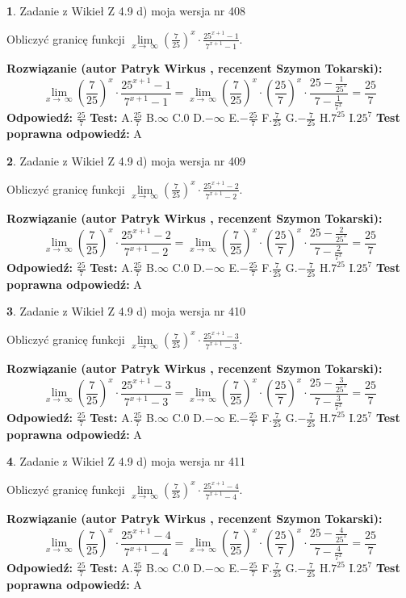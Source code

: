 \documentclass[12pt, a4paper]{article}
\theoremstyle{definition} %
\newtheorem{zad}{}
\newcommand{\zadStart}[1]{\begin{zad}#1\newline}
\newcommand{\zadStop}{\end{zad}}
\newcommand{\rozwStart}[2]{\noindent \textbf{Rozwiązanie (autor #1 , recenzent #2): }\newline}
\newcommand{\rozwStop}{\newline}
\newcommand{\odpStart}{\noindent \textbf{Odpowiedź:}\newline}
\newcommand{\odpStop}{\newline}
\newcommand{\testStart}{\noindent \textbf{Test:}\newline}
\newcommand{\testStop}{\newline}
\newcommand{\kluczStart}{\noindent \textbf{Test poprawna odpowiedź:}\newline}
\newcommand{\kluczStop}{\newline}
\begin{document}
\zadStart{Zadanie z Wikieł Z 4.9 d) moja wersja nr 408}


Obliczyć granicę funkcji  $\lim\limits_{x\to\ \infty}(\frac{7}{25})^{x}\cdot\frac{25^{x+1}-1}{7^{x+1}-1}$.
\zadStop
\rozwStart{Patryk Wirkus}{Szymon Tokarski}
$$\lim\limits_{x\to\ \infty}(\frac{7}{25})^{x}\cdot\frac{25^{x+1}-1}{7^{x+1}-1}=\lim\limits_{x\to\ \infty}(\frac{7}{25})^{x}\cdot(\frac{25}{7})^{x} \cdot \frac{25-\frac{1}{25^{x}}}{7-\frac{1}{7^{x}}} = \frac{25}{7}$$
\rozwStop
\odpStart
$\frac{25}{7}$
\odpStop
\testStart
A.$\frac{25}{7}$ B.$\infty$ C.$0$ D.$-\infty$ E.$-\frac{25}{7}$
F.$\frac{7}{25}$ G.$-\frac{7}{25}$
H.$7^{25}$
I.$25^{7}$
\testStop
\kluczStart
A
\kluczStop



\zadStart{Zadanie z Wikieł Z 4.9 d) moja wersja nr 409}


Obliczyć granicę funkcji  $\lim\limits_{x\to\ \infty}(\frac{7}{25})^{x}\cdot\frac{25^{x+1}-2}{7^{x+1}-2}$.
\zadStop
\rozwStart{Patryk Wirkus}{Szymon Tokarski}
$$\lim\limits_{x\to\ \infty}(\frac{7}{25})^{x}\cdot\frac{25^{x+1}-2}{7^{x+1}-2}=\lim\limits_{x\to\ \infty}(\frac{7}{25})^{x}\cdot(\frac{25}{7})^{x} \cdot \frac{25-\frac{2}{25^{x}}}{7-\frac{2}{7^{x}}} = \frac{25}{7}$$
\rozwStop
\odpStart
$\frac{25}{7}$
\odpStop
\testStart
A.$\frac{25}{7}$ B.$\infty$ C.$0$ D.$-\infty$ E.$-\frac{25}{7}$
F.$\frac{7}{25}$ G.$-\frac{7}{25}$
H.$7^{25}$
I.$25^{7}$
\testStop
\kluczStart
A
\kluczStop



\zadStart{Zadanie z Wikieł Z 4.9 d) moja wersja nr 410}


Obliczyć granicę funkcji  $\lim\limits_{x\to\ \infty}(\frac{7}{25})^{x}\cdot\frac{25^{x+1}-3}{7^{x+1}-3}$.
\zadStop
\rozwStart{Patryk Wirkus}{Szymon Tokarski}
$$\lim\limits_{x\to\ \infty}(\frac{7}{25})^{x}\cdot\frac{25^{x+1}-3}{7^{x+1}-3}=\lim\limits_{x\to\ \infty}(\frac{7}{25})^{x}\cdot(\frac{25}{7})^{x} \cdot \frac{25-\frac{3}{25^{x}}}{7-\frac{3}{7^{x}}} = \frac{25}{7}$$
\rozwStop
\odpStart
$\frac{25}{7}$
\odpStop
\testStart
A.$\frac{25}{7}$ B.$\infty$ C.$0$ D.$-\infty$ E.$-\frac{25}{7}$
F.$\frac{7}{25}$ G.$-\frac{7}{25}$
H.$7^{25}$
I.$25^{7}$
\testStop
\kluczStart
A
\kluczStop



\zadStart{Zadanie z Wikieł Z 4.9 d) moja wersja nr 411}


Obliczyć granicę funkcji  $\lim\limits_{x\to\ \infty}(\frac{7}{25})^{x}\cdot\frac{25^{x+1}-4}{7^{x+1}-4}$.
\zadStop
\rozwStart{Patryk Wirkus}{Szymon Tokarski}
$$\lim\limits_{x\to\ \infty}(\frac{7}{25})^{x}\cdot\frac{25^{x+1}-4}{7^{x+1}-4}=\lim\limits_{x\to\ \infty}(\frac{7}{25})^{x}\cdot(\frac{25}{7})^{x} \cdot \frac{25-\frac{4}{25^{x}}}{7-\frac{4}{7^{x}}} = \frac{25}{7}$$
\rozwStop
\odpStart
$\frac{25}{7}$
\odpStop
\testStart
A.$\frac{25}{7}$ B.$\infty$ C.$0$ D.$-\infty$ E.$-\frac{25}{7}$
F.$\frac{7}{25}$ G.$-\frac{7}{25}$
H.$7^{25}$
I.$25^{7}$
\testStop
\kluczStart
A
\kluczStop
\end{document}
